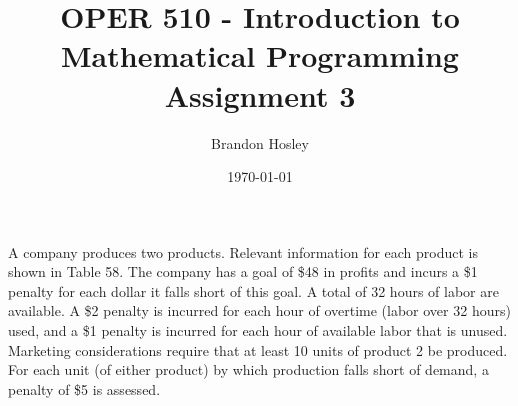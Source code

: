 \documentclass[answers]{exam}
\title{OPER 510 - Introduction to Mathematical Programming%
	\\ Assignment 3}
\author{Brandon Hosley}
\date{\today}
\begin{document}
\maketitle
\unframedsolutions

\begin{questions}
\question
A company produces two products. Relevant information for each product is shown in Table 58. The company has a goal of \$48 in profits and incurs a \$1 penalty for each dollar it falls short of this goal. A total of 32 hours of labor are available. A \$2 penalty is incurred for each hour of overtime (labor over 32 hours) used, and a \$1 penalty is incurred for each hour of available labor that is unused. Marketing considerations require that at least 10 units of product 2 be produced. For each unit (of either product) by which production falls short of demand, a penalty of \$5 is assessed.


\end{questions}
\end{document}
